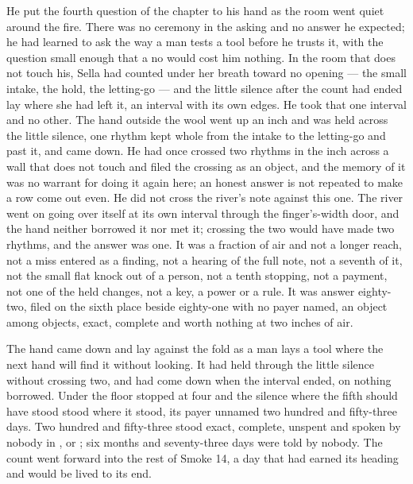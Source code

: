 He put the fourth question of the chapter to his hand as the room went quiet around the fire. There was no ceremony in the asking and no answer he expected; he had learned to ask the way a man tests a tool before he trusts it, with the question small enough that a no would cost him nothing. In the room that does not touch his, Sella had counted under her breath toward no opening --- the small intake, the hold, the letting-go --- and the little silence after the count had ended lay where she had left it, an interval with its own edges. He took that one interval and no other. The hand outside the wool went up an inch and was held across the little silence, one rhythm kept whole from the intake to the letting-go and past it, and came down. He had once crossed two rhythms in the inch across a wall that does not touch and filed the crossing as an object, and the memory of it was no warrant for doing it again here; an honest answer is not repeated to make a row come out even. He did not cross the river's note against this one. The river went on going over itself at its own interval through the finger's-width door, and the hand neither borrowed it nor met it; crossing the two would have made two rhythms, and the answer was one. It was a fraction of air and not a longer reach, not a miss entered as a finding, not a hearing of the full note, not a seventh of it, not the small flat knock out of a person, not a tenth stopping, not a payment, not one of the held changes, not a key, a power or a rule. It was answer eighty-two, filed on the sixth place beside eighty-one with no payer named, an object among objects, exact, complete and worth nothing at two inches of air.

The hand came down and lay against the fold as a man lays a tool where the next hand will find it without looking. It had held through the little silence without crossing two, and had come down when the interval ended, on nothing borrowed. Under the floor  stopped at four and the silence where the fifth should have stood stood where it stood, its payer unnamed two hundred and fifty-three days. Two hundred and fifty-three stood exact, complete, unspent and spoken by nobody in ,  or ; six months and seventy-three days were told by nobody. The count went forward into the rest of Smoke 14, a day that had earned its heading and would be lived to its end.
